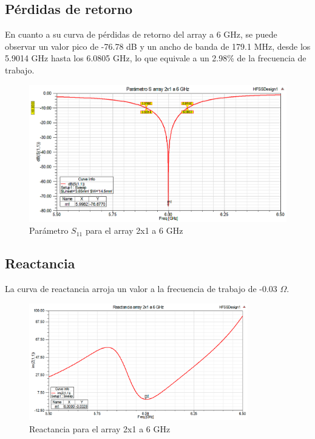 \subsection{Pérdidas de retorno}
\par En cuanto a su curva de pérdidas de retorno del array a 6 GHz, se puede observar un valor pico de -76.78 dB y un ancho de banda de 179.1 MHz, desde los 5.9014 GHz hasta los 6.0805 GHz, lo que equivale a un 2.98\% de la frecuencia de trabajo.
\\
\begin{figure}[H]
    \centering
        \includegraphics[width=\textwidth]{archivos/analisis/2x12/1}
        \caption{Parámetro $S_{11}$ para el array 2x1 a 6 GHz}
        \label{fig:s2x12}
\end{figure}

\newpage
\subsection{Reactancia}
\par La curva de reactancia arroja un valor a la frecuencia de trabajo de -0.03 $\Omega$. 
\\
\begin{figure}[H]
    \centering
        \includegraphics[width=0.85\textwidth]{archivos/analisis/2x12/2}
        \caption{Reactancia para el array 2x1 a 6 GHz}
        \label{fig:react2x12}
\end{figure}

